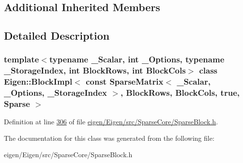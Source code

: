 \subsection*{Additional Inherited Members}


\subsection{Detailed Description}
\subsubsection*{template$<$typename \+\_\+\+Scalar, int \+\_\+\+Options, typename \+\_\+\+Storage\+Index, int Block\+Rows, int Block\+Cols$>$\newline
class Eigen\+::\+Block\+Impl$<$ const Sparse\+Matrix$<$ \+\_\+\+Scalar, \+\_\+\+Options, \+\_\+\+Storage\+Index $>$, Block\+Rows, Block\+Cols, true, Sparse $>$}



Definition at line \hyperlink{eigen_2_eigen_2src_2_sparse_core_2_sparse_block_8h_source_l00306}{306} of file \hyperlink{eigen_2_eigen_2src_2_sparse_core_2_sparse_block_8h_source}{eigen/\+Eigen/src/\+Sparse\+Core/\+Sparse\+Block.\+h}.



The documentation for this class was generated from the following file\+:\begin{DoxyCompactItemize}
\item 
eigen/\+Eigen/src/\+Sparse\+Core/\+Sparse\+Block.\+h\end{DoxyCompactItemize}
